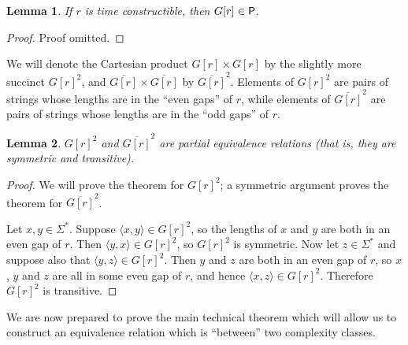 \documentclass[draft]{article}
\newtheorem{lemma}[lemma]{Lemma}
\theoremstyle{definition} \newtheorem{openproblem}[openproblem]{Open problem}
\theoremstyle{definition} \newtheorem{definition}[definition]{Definition}
\theoremstyle{remark} \newtheorem{remark}[remark]{Remark}
\newcommand{\defn}[1]{\emph{#1}} %
\newcommand{\pair}[2]{\langle#1,#2\rangle} %
\begin{document}
\begin{lemma}\label{lem:gap_p}
  If $r$ is time constructible, then $G[r]\in\P$.
\end{lemma}
\begin{proof}
  Proof omitted.
\end{proof}

We will denote the Cartesian product $G[r]\times G[r]$ by the slightly more succinct ${G[r]}^2$, and $\overline{G[r]}\times\overline{G[r]}$ by $\overline{G[r]}^2$.
Elements of ${G[r]}^2$ are pairs of strings whose lengths are in the ``even gaps'' of $r$, while elements of $\overline{G[r]}^2$ are pairs of strings whose lengths are in the ``odd gaps'' of $r$.

\begin{lemma}
  ${G[r]}^2$ and $\overline{G[r]}^2$ are \defn{partial equivalence relations} (that is, they are symmetric and transitive).
\end{lemma}
\begin{proof}
  We will prove the theorem for ${G[r]}^2$; a symmetric argument proves the theorem for $\overline{G[r]}^2$.

  Let $x,y\in\Sigma^*$.
  Suppose $\pair{x}{y}\in {G[r]}^2$, so the lengths of $x$ and $y$ are both in an even gap of $r$.
  Then $\pair{y}{x}\in{G[r]}^2$, so ${G[r]}^2$ is symmetric.
  Now let $z\in\Sigma^*$ and suppose also that $\pair{y}{z}\in {G[r]}^2$.
  Then $y$ and $z$ are both in an even gap of $r$, so $x$, $y$ and $z$ are all in some even gap of $r$, and hence $\pair{x}{z}\in {G[r]}^2$.
  Therefore ${G[r]}^2$ is transitive.
\end{proof}

We are now prepared to prove the main technical theorem which will allow us to construct an equivalence relation which is ``between'' two complexity classes.
\end{document}
